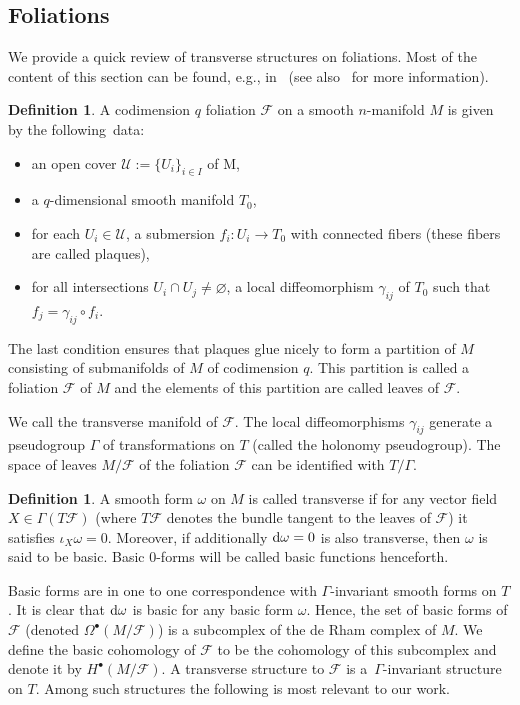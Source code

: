 \documentclass[10pt,a4paper]{amsart}
\numberwithin{equation}{section}
\theoremstyle{definition}
\newtheorem{defi}[tw]{Definition}
\begin{document}
\subsection{Foliations}
We provide a quick review of transverse structures on foliations. Most of the content of this section can be found, e.g., in~\cite{E1} (see also~\cite{M} for more information).
\begin{defi} A codimension $q$ foliation $\mathcal{F}$ on a smooth $n$-manifold $M$ is given by the following~data:
\begin{itemize}\itemsep=0pt
\item an open cover $\mathcal{U}:=\{U_i\}_{i\in I}$ of M,
\item a $q$-dimensional smooth manifold $T_0$,
\item for each $U_i\in\mathcal{U}$, a submersion $f_i\colon U_i\rightarrow T_0$ with connected fibers (these fibers are called plaques),
\item for all intersections $U_i\cap U_j\neq\varnothing$, a local diffeomorphism $\gamma_{ij}$ of $T_0$ such that $f_j=\gamma_{ij}\circ f_i$.
\end{itemize}
The last condition ensures that plaques glue nicely to form a partition of $M$ consisting of submanifolds of $M$ of codimension $q$. This partition is called a foliation $\mathcal{F}$ of $M$ and the elements of this partition are called leaves of $\mathcal{F}$.
\end{defi}
We call  the transverse manifold of $\mathcal{F}$. The local diffeomorphisms $\gamma_{ij}$ generate a pseudogroup $\Gamma$ of transformations on $T$ (called the holonomy pseudogroup). The space of leaves $M\slash\mathcal{F}$ of the foliation $\mathcal{F}$ can be identified with $T\slash\Gamma$.
\begin{defi}
 A smooth form $\omega$ on $M$ is called transverse if for any vector field $X\in\Gamma (T\mathcal{F})$ (where $T\mathcal{F}$ denotes the bundle tangent to the leaves of $\mathcal{F}$) it satisfies $\iota_X\omega=0$. Moreover, if additionally ${\rm d}\omega=0$ is also transverse, then $\omega$ is said to be basic. Basic $0$-forms will be called basic functions henceforth.
\end{defi}
Basic forms are in one to one correspondence with $\Gamma$-invariant smooth forms on $T$. It is clear that ${\rm d}\omega$ is basic for any basic form $\omega$. Hence, the set of basic forms of $\mathcal{F}$ (denoted $\Omega^{\bullet}(M\slash\mathcal{F})$) is a subcomplex of the de Rham complex of $M$. We define the basic cohomology of $\mathcal{F}$ to be the cohomology of this subcomplex and denote it by $H^{\bullet}(M\slash\mathcal{F})$. A transverse structure to $\mathcal{F}$ is a~$\Gamma$-invariant structure on $T$. Among such structures the following is most relevant to our work.
\end{document}
